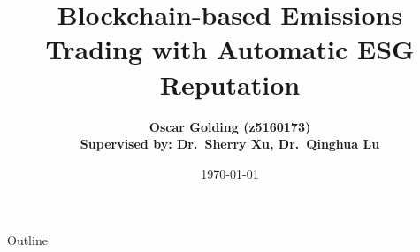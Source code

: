 \documentclass[xcolor=table]{beamer}
\title{Blockchain-based Emissions Trading with Automatic ESG Reputation}
\author[Oscar Golding]
{\textbf{Oscar Golding (z5160173)
\texorpdfstring{\\} 
\footnotesize Supervised by: Dr.~Sherry Xu, Dr.~Qinghua Lu}}
\institute[UNSW]{Thesis C: UNSW}
\date{\today}
\begin{document}
\begin{frame}
    \titlepage
\end{frame}

\begin{frame}{Outline}
    \tableofcontents
\end{frame}









\end{document}
